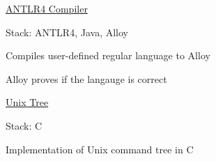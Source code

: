 \begin{cventries}
  \cventrynoposition
    {\href{https://github.com/basulaib/ANTLR4Compiler}{ANTLR4 Compiler}} %
    {
      \begin{cvitems} %
        \item {Stack: ANTLR4, Java, Alloy}
        \item {Compiles user-defined regular language to Alloy}
        \item {Alloy proves if the langauge is correct}
      \end{cvitems}
    }
    

  \cventrynoposition
    {\href{https://github.com/basulaib/tree}{Unix Tree}} %
    {
      \begin{cvitems} %
        \item {Stack: C}
        \item {Implementation of Unix command tree in C}
      \end{cvitems}
    }


\end{cventries}
